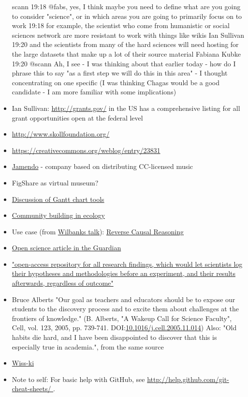\documentclass[final,authoryear,3p]{elsarticle-open-drafting}
\begin{document}
\begin{itemize}
scann 19:18 
@fabs, yes, I think maybe you need to define what are you going to consider "science", or in which areas you are going to primarily focus on to work
19:18
for example, the scientist who come from humanistic or social sciences network are more resistant to work with things like wikis
Ian Sullivan 19:20 
and the scientists from many of the hard sciences will need hosting for the large datasets that make up a lot of their source material
Fabiana Kubke 19:20 
@scann Ah, I see - I was thinking about that earlier today - how do I phrase this to say "as a first step we will do this in this area" - I thought concentrating on one specific (I was thinking Chagas would be a good candidate - I am more familiar with some implications)
	\item Ian Sullivan: \href{http://grants.gov/}{http://grants.gov/}  in the US has a comprehensive listing for all grant opportunities open at the federal level
	\item \href{http://www.skollfoundation.org/}{http://www.skollfoundation.org/}
	\item \href{https://creativecommons.org/weblog/entry/23831}{https://creativecommons.org/weblog/entry/23831}
	\item \href{http://www.jamendo.com/en/creativecommons}{Jamendo} - company based on distributing CC-licensed music
	\item FigShare as virtual museum?
	\item \href{http://ff.im/D6rQ0}{Discussion of Gantt chart tools}
	\item \href{http://dx.doi.org/10.1038/npre.2010.4603.1}{Community building in ecology}
	\item Use case (from \href{}{Wilbanks talk}): \href{http://selventa.com/technology/white-papers}{Reverse Causal Reasoning}
	\item \href{http://www.guardian.co.uk/education/2011/may/22/open-science-shared-research-internet}{Open science article in the Guardian}
	\item \href{http://www.nature.com/news/2011/110223/full/470437a.html}{"open-access repository for all research findings, which would let scientists log their hypotheses and methodologies before an experiment, and their results afterwards, regardless of outcome"}
	\item Bruce Alberts "Our goal as teachers and educators should be to expose our students to the discovery process and to excite them about challenges at the frontiers of knowledge." (B. Alberts, "A Wakeup Call for Science Faculty", Cell, vol. 123, 2005, pp. 739-741. DOI:\href{http://dx.doi.org/10.1016/j.cell.2005.11.014}{10.1016/j.cell.2005.11.014})
	Also: "Old habits die hard, and I have been disappointed to discover that this is especially true in academia.", from the same source
	\item \href{http://wiss-ki.eu/}{Wiss-ki}
	\item Note to self: For basic help with GitHub, see \href{http://help.github.com/git-cheat-sheets/}{http://help.github.com/git-cheat-sheets/ } .
\end{itemize}
\end{document}
